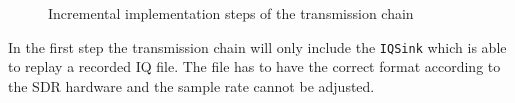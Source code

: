 \begin{figure}


\caption{Incremental implementation steps of the transmission chain}
\label{fig:tx_chain}
\end{figure}

In the first step the transmission chain will only include the \texttt{IQSink} which is
able to replay a recorded IQ file. The file has to have the correct format according
to the \ac{SDR} hardware and the sample rate cannot be adjusted.


